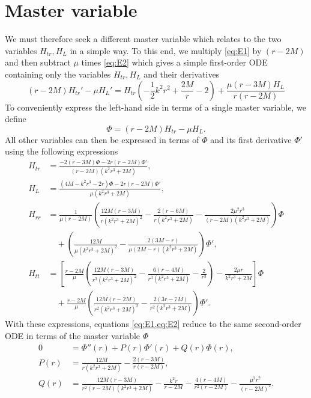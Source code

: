 \documentclass[11pt,aip,jmp,amsmath,amssymb,draft]{revtex4-1}
\begin{document}
\section{\label{sec:master}Master variable}
We must therefore seek a different master variable which relates to the two variables $H_{tr}, H_L$ in a simple way.
To this end, we multiply \cref{eq:E1} by $(r-2M)$ and then subtract $\mu$ times \cref{eq:E2} which gives a simple first-order ODE containing only the variables $H_{tr}, H_L$ and their derivatives
\begin{equation}
    (r-2 M) H_{tr}'-\mu H_L'=H_{tr} \left(-\frac{1}{2} k^2 r^2+\frac{2 M}{r}-2\right)+\frac{\mu (r-3 M) H_L}{r (r-2 M)}
\end{equation}
To conveniently express the left-hand side in terms of a single master variable, we define
\begin{equation} \label{eq:Phi_def}
    \Phi= (r-2 M) H_{tr}-\mu H_L.
\end{equation}
All other variables can then be expressed in terms of $\Phi$ and its first derivative $\Phi'$ using the following expressions
\begin{align}
    H_{tr} &= \frac{-2(r - 3M)\Phi - 2 r (r-2M)\Phi'}{(r- 2M) \left(k^2 r^3+2 M\right)}, \label{eq:HtrPhi}\\
    H_L &= \frac{\left(4M - k^2 r^3-2 r\right)\Phi -     2r(r-2 M) \Phi '}{\mu \left(k^2 r^3+2 M\right)}, \label{eq:HLPhi} \\
    H_{rr} &= \frac{1}{\mu(r-2M)}\left(\frac{12 M(r-3M)}{r\left(k^2 r^3+2 M\right)^2}-\frac{2 (r- 6M)}{r\left(k^2 r^3+2 M\right)} -\frac{2 \mu^2 r^3}{(r-2M)\left(k^2 r^3+2 M\right)}\right) \Phi  \nonumber  \\
     &\quad + \left(\frac{12 M}{\mu \left(k^2 r^3+2 M\right)^2}-\frac{2 (3 M-r)}{\mu (2 M-r) \left(k^2 r^3+2 M\right)}\right) \Phi', \label{eq:HrrPhi} \\ 
    H_{tt} &= \left[\frac{r-2M}{\mu} \left(\frac{12 M (r-3 M)}{r^3 \left(k^2 r^3+2 M\right)^2} -\frac{6 (r - 4M)}{r^3 \left(k^2 r^3+2 M\right)} -\frac{2}{r^3}\right)-\frac{2 \mu r}{k^2 r^3+2 M}\right] \Phi  \nonumber \\ 
     &\quad + \frac{r-2M}{\mu} \left(\frac{12 M (r-2 M)}{r^2 \left(k^2 r^3+2 M\right)^2}-\frac{2 \left(3 r - 7 M\right)}{r^2 \left(k^2 r^3+2 M\right)}\right) \Phi'. \label{eq:HttPhi} 
\end{align}
With these expressions, equations \cref{eq:E1,eq:E2} reduce to the same second-order ODE in terms of the master variable $\Phi$
\begin{align} \label{eq:master_ODE}
    0 &= \Phi''(r) + P(r) \Phi'(r) + Q(r) \Phi(r), \\
    P(r) &= \frac{12 M}{r \left(k^2 r^3+2 M\right)}-\frac{2 (r-3M)}{r (r-2M)}, \nonumber \\
    Q(r) &= \frac{12 M(r-3M)}{r^2 (r-2M) \left(k^2 r^3+2 M\right)}- \frac{k^2 r}{r- 2M}-\frac{4 (r-4M)}{r^2 (r-2 M)} -\frac{\mu^2 r^2}{(r-2M)^2}. \nonumber
\end{align}
\end{document}
